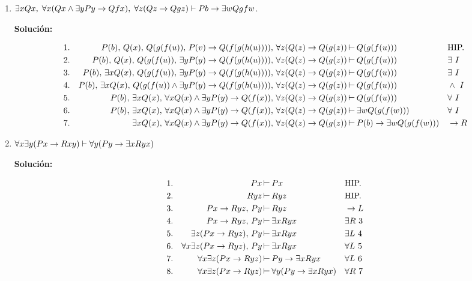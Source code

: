 \documentclass[11pt,letterpaper]{article}
\newcommand{\coso}{\mathbin{\rotatebox[origin=c]{270}{$\perp$}}}
\begin{document}
\begin{enumerate}
\begin{enumerate}
\item $\exists x Qx, \;\forall x (Qx \land \exists y Py \to Qfx),\;\forall z(Qz\to Qgz)
  \vdash Pb \to \exists w Qgfw$.

  \hfill\break
  {\bf Solución:}

  \begin{align*}
    1.& & P(b),\, Q(x),\, Q(g(f(u)),\, P(v) \rightarrow Q(f(g(h(u)))),\,
    \forall z (Q(z)\rightarrow Q(g(z)) &\coso Q(g(f(u))) & &\text{HIP.}\\
    2.& & P(b),\, Q(x),\, Q(g(f(u)),\, \exists yP(y) \rightarrow Q(f(g(h(u)))),
    \,\forall z (Q(z)\rightarrow Q(g(z)) &\coso Q(g(f(u))) & &\exists\ I\\
    3.& & P(b),\,\exists x Q(x),\, Q(g(f(u)),\, \exists yP(y) \rightarrow Q(f(g(h(u)))),
    \,\forall z (Q(z)\rightarrow Q(g(z)) &\coso Q(g(f(u))) & &\exists\ I\\
    4.& & P(b),\,\exists x Q(x),\, Q(g(f(u))\land \exists yP(y) \rightarrow Q(f(g(h(u)))),
    \,\forall z (Q(z)\rightarrow Q(g(z)) &\coso Q(g(f(u))) & &\land\ I\\
    5.& & P(b),\,\exists x Q(x),\,\forall x Q(x)\land \exists yP(y) \rightarrow Q(f(x)),
    \,\forall z (Q(z)\rightarrow Q(g(z)) &\coso Q(g(f(u))) & &\forall\ I\\
    6.& & P(b),\,\exists x Q(x),\,\forall x Q(x)\land \exists yP(y) \rightarrow Q(f(x)),
    \,\forall z (Q(z)\rightarrow Q(g(z)) &\coso \exists w Q(g(f(w))) & &\forall\ I\\
    7.& & \exists x Q(x),\,\forall x Q(x)\land \exists yP(y) \rightarrow Q(f(x)),
    \,\forall z (Q(z)\rightarrow Q(g(z)) &\coso P(b) \rightarrow \exists w Q(g(f(w))) & &\rightarrow R\\
  \end{align*}
\item $\forall x\exists y(Px \rightarrow Rxy) \vdash \forall y(Py \rightarrow\exists x Ryx)$

  \hfill\break
  {\bf Solución:}

  \begin{align*}
    1.& & Px &\coso Px & &\text{HIP.}\\
    2.& & Ryz &\coso Ryz & &\text{HIP.}\\
    3.& & Px\rightarrow Ryz,\, Py &\coso Ryz & &\rightarrow L\\
    4.& & Px\rightarrow Ryz,\, Py &\coso \exists x Ryx & &\exists R\ 3\\
    5.& & \exists z(Px\rightarrow Ryz),\, Py &\coso \exists x Ryx
    & &\exists L\ 4\\
    6.& & \forall x\exists z(Px\rightarrow Ryz),\, Py
    &\coso \exists x Ryx & &\forall L\ 5\\
    7.& & \forall x\exists z(Px\rightarrow Ryz) &\coso
    Py\rightarrow \exists x Ryx & &\forall L\ 6\\
    8.& & \forall x\exists z(Px\rightarrow Ryz) &\coso
    \forall y(Py\rightarrow \exists x Ryx) & &\forall R\ 7\\
  \end{align*}
\end{enumerate}


\end{enumerate}
\end{document}
